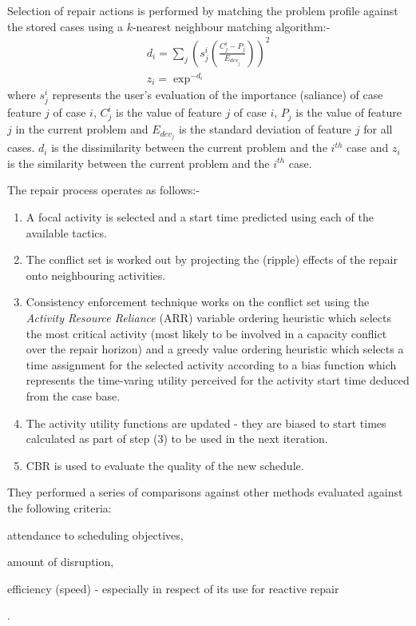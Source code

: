 Selection of repair actions is performed by matching the problem profile against the stored cases using a $k$-nearest neighbour matching algorithm:-
\begin{eqnarray}
d_i = \sum_j (s^i_j (\frac {C^i_j - P_j}{E_{dev_j}}))^2 \\
z_i = \exp^{-d_i}
\end{eqnarray}
where $s^i_j$ represents the user's evaluation of the importance (saliance) of case feature $j$ of case $i$, $C^i_j$ is the value of feature $j$ of case $i$, $P_j$ is the value of feature $j$ in the current problem and 
$E_{dev_j}$ is the standard deviation of feature $j$ for all cases. $d_i$ is the dissimilarity between the current problem and the $i^{th}$ case and $z_i$ is the similarity between the current problem and the $i^{th}$ case.

The repair process operates as follows:-
\begin{enumerate}
\item A focal activity is selected and a start time predicted using each of the available tactics.
\item The conflict set is worked out by projecting the (ripple) effects of the repair onto neighbouring activities.
\item Consistency enforcement technique works on the conflict set using the \emph{Activity Resource Reliance} (ARR) variable ordering heuristic which selects the most critical activity (most likely to be involved in a capacity conflict over the repair horizon) and a greedy value ordering heuristic which selects a time assignment for the selected activity according to a bias function which represents the time-varing utility perceived for the activity start time deduced from the case base.
\item The activity utility functions are updated - they are biased to start times calculated as part of step (3) to be used in the next iteration.
\item CBR is used to evaluate the quality of the new schedule.
\end{enumerate}

They performed a series of comparisons against other methods evaluated against the following criteria: \begin{inparaenum} \item attendance to scheduling objectives, \item amount of disruption, \item efficiency (speed) - especially in respect of its use for reactive repair \end{inparaenum}.

